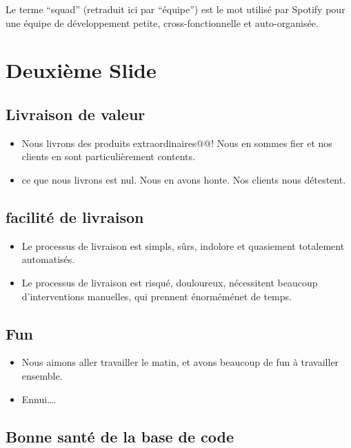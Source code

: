 Le terme ``squad''  (retraduit ici par ``équipe'') est le mot utilisé par Spotify pour une équipe de développement petite, cross-fonctionnelle et auto-organisée.

\section{Deuxième Slide}\hypertarget{deuxime-slide}{}\label{deuxime-slide}

\subsection{Livraison de valeur}\hypertarget{livraison-de-valeur}{}\label{livraison-de-valeur}

\begin{itemize}
\item Nous livrons des produits extraordinaires@@! Nous en sommes fier et nos clients en sont particulièrement contents.
\item ce que nous livrons est nul. Nous en avons honte. Nos clients nous détestent.
\end{itemize}

\subsection{facilité de livraison}\hypertarget{facilit-de-livraison}{}\label{facilit-de-livraison}

\begin{itemize}
\item Le processus de livraison est simpls, sûrs, indolore et quasiement totalement automatisés.
\item Le processus de livraison est risqué, douloureux, nécessitent beaucoup d'interventions manuelles, qui prennent énorméménet de temps.
\end{itemize}

\subsection{Fun}\hypertarget{fun}{}\label{fun}

\begin{itemize}
\item Nous aimons aller travailler le matin, et avons beaucoup de fun à travailler ensemble.
\item Ennui\ldots{}.
\end{itemize}

\subsection{Bonne santé de la base de code}\hypertarget{bonne-sant-de-la-base-de-code}{}\label{bonne-sant-de-la-base-de-code}

